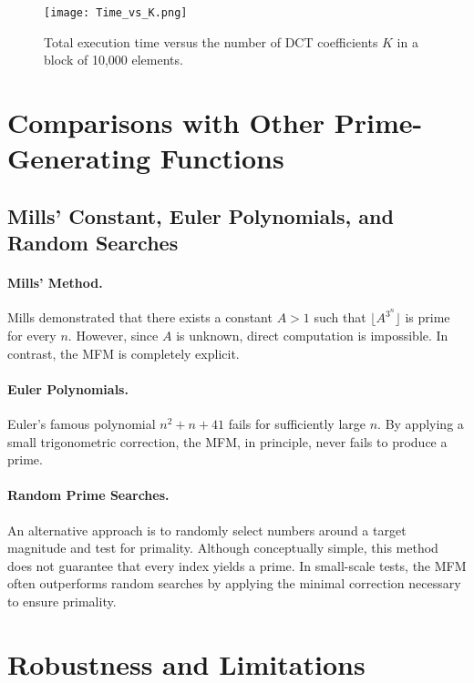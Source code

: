 \documentclass[12pt]{article}
\begin{document}
\begin{figure}[H]
\centering
\texttt{[image: Time\_vs\_K.png]}
\caption[Execution time vs. $K$]{Total execution time versus the number of DCT coefficients $K$ in a block of 10,000 elements.}
\label{fig:timeK}
\end{figure}

\section{Comparisons with Other Prime-Generating Functions}

\subsection{Mills’ Constant, Euler Polynomials, and Random Searches}
\paragraph{Mills’ Method.} Mills \cite{Mills} demonstrated that there exists a constant $A>1$ such that $\lfloor A^{3^n}\rfloor$ is prime for every $n$. However, since $A$ is unknown, direct computation is impossible. In contrast, the MFM is completely explicit.

\paragraph{Euler Polynomials.} Euler’s famous polynomial $n^2+n+41$ fails for sufficiently large $n$. By applying a small trigonometric correction, the MFM, in principle, never fails to produce a prime.

\paragraph{Random Prime Searches.} An alternative approach is to randomly select numbers around a target magnitude and test for primality. Although conceptually simple, this method does not guarantee that every index yields a prime. In small-scale tests, the MFM often outperforms random searches by applying the minimal correction necessary to ensure primality.

\section{Robustness and Limitations}
\end{document}
